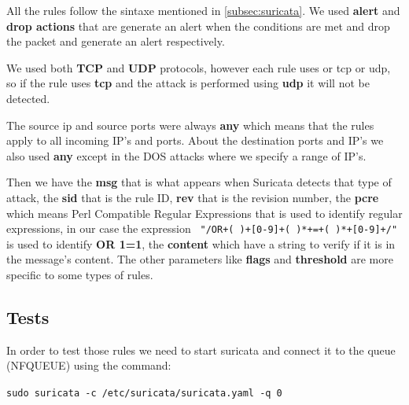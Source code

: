\documentclass{article}
\begin{document}
All the rules follow the sintaxe mentioned in \ref{subsec:suricata}. We used \textbf{alert} and \textbf{drop actions} that are generate an alert when the conditions are met and drop the packet and generate an alert respectively.\par
We used both \textbf{TCP} and \textbf{UDP} protocols, however each rule uses or tcp or udp, so if the rule uses \textbf{tcp} and the attack is performed using \textbf{udp} it will not be detected. \par
The source ip and source ports were always \textbf{any} which means that the rules apply to all incoming IP's and ports. About the destination ports and IP's we also used \textbf{any} except in the DOS attacks where we specify a range of IP's.\par
Then we have the \textbf{msg} that is what appears when Suricata detects that type of attack, the \textbf{sid} that is the rule ID, \textbf{rev} that is the revision number, the \textbf{pcre} which means Perl Compatible Regular Expressions that is used to identify regular expressions, in our case the expression \texttt{ "/OR+( )+[0-9]+( )*+=+( )*+[0-9]+/"} is used to identify \textbf{OR 1=1}, the \textbf{content} which have a string to verify if it is in the message's content. The other parameters like \textbf{flags} and \textbf{threshold} are more specific to some types of rules.


\subsection{Tests}

In order to test those rules we need to start suricata and connect it to the queue (NFQUEUE) using the command:\par
\texttt{sudo suricata -c /etc/suricata/suricata.yaml -q 0}\par
\texttt{}\par
\end{document}
